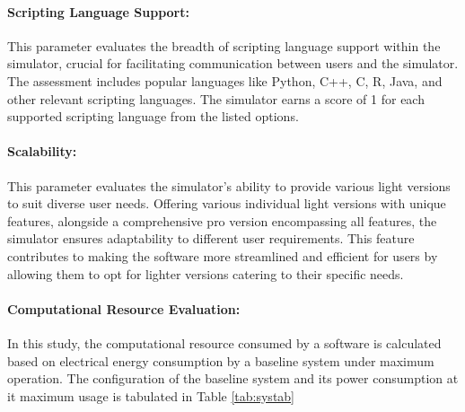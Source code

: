 \documentclass[12pt,twoside,a4paper,parskip]{scrbook} %
\begin{document}
\paragraph*{Scripting Language Support:}
This parameter evaluates the breadth of scripting language support within the simulator, crucial for facilitating communication between users and the simulator. The assessment includes popular languages like Python, C++, C, R, Java, and other relevant scripting languages. The simulator earns a score of 1 for each supported scripting language from the listed options.

\paragraph*{Scalability:}
This parameter evaluates the simulator's ability to provide various light versions to suit diverse user needs. Offering various individual light versions with unique features, alongside a comprehensive pro version encompassing all features, the simulator ensures adaptability to different user requirements. This feature contributes to making the software more streamlined and efficient for users by allowing them to opt for lighter versions catering to their specific needs.

\paragraph*{Computational Resource Evaluation:}
In this study, the computational resource consumed by a software is calculated based on electrical energy consumption by a baseline system under maximum operation. The configuration of the baseline system and its power consumption at it maximum usage is tabulated in Table \ref{tab:systab}
\end{document}
